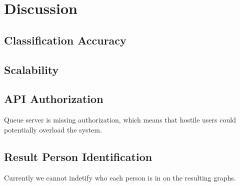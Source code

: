\chapter{Discussion}\label{cha:disc}

\section{Classification Accuracy}

\section{Scalability}

\section{\acs{API} Authorization}\label{disc:auth}
Queue server is missing authorization, which means that hostile users could
potentially overload the system.

\section{Result Person Identification}
Currently we cannot indetify who each person is in on the resulting graphs.